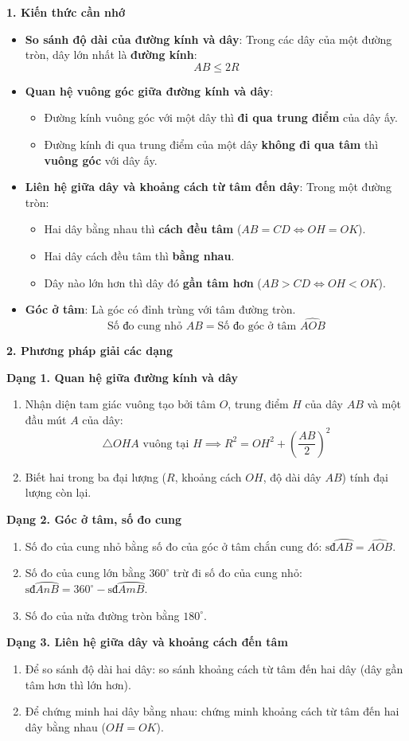 \textbf{1. Kiến thức cần nhớ}
\begin{itemize}
\item \textbf{So sánh độ dài của đường kính và dây}: Trong các dây của một đường tròn, dây lớn nhất là \textbf{đường kính}:
$$\boxed{AB \le 2R}$$
\item \textbf{Quan hệ vuông góc giữa đường kính và dây}:
\begin{itemize}
\item Đường kính vuông góc với một dây thì \textbf{đi qua trung điểm} của dây ấy.
\item Đường kính đi qua trung điểm của một dây \textbf{không đi qua tâm} thì \textbf{vuông góc} với dây ấy.
\end{itemize}
\item \textbf{Liên hệ giữa dây và khoảng cách từ tâm đến dây}: Trong một đường tròn:
\begin{itemize}
\item Hai dây bằng nhau thì \textbf{cách đều tâm} ($AB = CD \iff OH = OK$).
\item Hai dây cách đều tâm thì \textbf{bằng nhau}.
\item Dây nào lớn hơn thì dây đó \textbf{gần tâm hơn} ($AB > CD \iff OH < OK$).
\end{itemize}
\item \textbf{Góc ở tâm}: Là góc có đỉnh trùng với tâm đường tròn.
$$\boxed{\text{Số đo cung nhỏ } AB = \text{Số đo góc ở tâm } \widehat{AOB}}$$
\end{itemize}

\textbf{2. Phương pháp giải các dạng}

\textbf{Dạng 1. Quan hệ giữa đường kính và dây}
\begin{enumerate}
\item Nhận diện tam giác vuông tạo bởi tâm $O$, trung điểm $H$ của dây $AB$ và một đầu mút $A$ của dây:
$$\triangle OHA\text{ vuông tại } H \implies \boxed{R^2 = OH^2 + \left(\dfrac{AB}{2}\right)^2}$$
\item Biết hai trong ba đại lượng ($R$, khoảng cách $OH$, độ dài dây $AB$) tính đại lượng còn lại.
\end{enumerate}

\textbf{Dạng 2. Góc ở tâm, số đo cung}
\begin{enumerate}
\item Số đo của cung nhỏ bằng số đo của góc ở tâm chắn cung đó: $\text{sđ}\wideparen{AB} = \widehat{AOB}$.
\item Số đo của cung lớn bằng $360^\circ$ trừ đi số đo của cung nhỏ: $\text{sđ}\wideparen{AnB} = 360^\circ - \text{sđ}\wideparen{AmB}$.
\item Số đo của nửa đường tròn bằng $180^\circ$.
\end{enumerate}

\textbf{Dạng 3. Liên hệ giữa dây và khoảng cách đến tâm}
\begin{enumerate}
\item Để so sánh độ dài hai dây: so sánh khoảng cách từ tâm đến hai dây (dây gần tâm hơn thì lớn hơn).
\item Để chứng minh hai dây bằng nhau: chứng minh khoảng cách từ tâm đến hai dây bằng nhau ($OH = OK$).
\end{enumerate}
